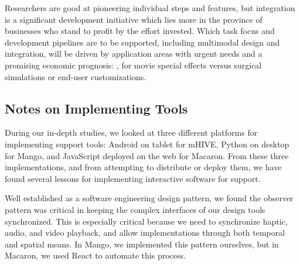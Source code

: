 \vspace{0.1in} \noindent 
Researchers are good at pioneering individual steps and features, but integration is a significant development initiative which lies more in the province of businesses who stand to profit by the effort invested. 
Which task focus and development pipelines are to be supported, including multimodal design and integration,  will be driven by application areas with urgent needs and a promising economic prognosis:  \eg, for movie special effects versus surgical simulations or end-user customizations.






%
%
\subsection{Notes on Implementing \haxd Tools}
During our in-depth studies, we looked at three different platforms for implementing \haxd support tools: Android on tablet for mHIVE, Python on desktop for Mango, and JavaScript deployed on the web for Macaron.
From these three implementations, and from attempting to distribute or deploy them, we have found several lessons for implementing interactive software for \haxd support.

Well established as a software engineering design pattern, we found the observer pattern was critical in keeping the complex interfaces of our design tools synchronized.
This is especially critical because we need to synchronize haptic, audio, and video playback, and allow implementations through both temporal and spatial means.
In Mango, we implemented this pattern ourselves, but in Macaron, we used React to automate this process.

